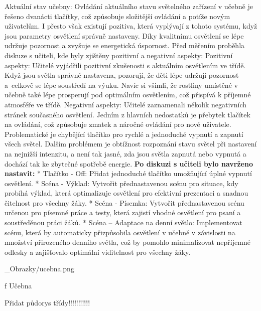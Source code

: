 \sec Aktuální stav učebny:
\medskip
Ovládání aktuálního stavu světelného zařízení v učebně je řešeno dvanácti tlačítky, což způsobuje složitější ovládání a potíže novým uživatelům. I přesto však existují pozitiva, která vyplývají z tohoto systému, když jsou parametry osvětlení správně nastaveny. Díky kvalitnímu osvětlení se lépe udržuje pozornost a zvyšuje se energetická úspornost.
\medskip
Před měřením proběhla diskuze s učiteli, kde byly zjištěny pozitivní a negativní aspekty:
\medskip
{\sbf Pozitivní aspekty:}
Učitelé vyjádřili pozitivní zkušenosti s aktuálním osvětlením ve třídě. Když jsou světla správně nastavena, pozorují, že děti lépe udržují pozornost a~celkově se lépe soustředí na výuku. Navíc si všimli, že rostliny umístěné v učebně také lépe prosperují pod optimálním osvětlením, což přispívá k příjemné atmosféře ve třídě.
\medskip
{\sbf Negativní aspekty:}
Učitelé zaznamenali několik negativních stránek současného osvětlení. Jedním z hlavních nedostatků je přebytek tlačítek na ovládání, což způsobuje zmatek a náročné ovládání pro nové uživatele. Problematické je chybějící tlačítko pro rychlé a jednoduché vypnutí a zapnutí všech světel. Dalším problémem je obtížnost rozpoznání stavu světel při nastavení na nejnižší intenzitu, a není tak jasné, zda jsou světla zapnutá nebo vypnutá a dochází tak ke zbytečné spotřebě energie. 
\medskip
{\bf Po diskuzi s učiteli bylo navrženo nastavit:}
\medskip
\begitems
    * {\sbf Tlačítko - Off:} Přidat jednoduché tlačítko umožňující úplné vypnutí osvětlení.
\medskip
    * {\sbf Scéna - Výklad:} Vytvořit přednastavenou scénu pro situace, kdy probíhá výklad, která optimalizuje osvětlení pro efektivní prezentaci a snadnou čitelnost pro všechny žáky.
\medskip
    * {\sbf Scéna - Písemka:} Vytvořit přednastavenou scénu určenou pro písemné práce a testy, která zajistí vhodné osvětlení pro psaní a soustředěnou práci žáků.
\medskip
    * {\sbf Scéna – Adaptace na denní světlo:} Implementovat scénu, která by automaticky přizpůsobila osvětlení v učebně v závislosti na množství přirozeného denního světla, což by pomohlo minimalizovat nepříjemné odlesky a zajišťovalo optimální viditelnost pro všechny žáky.
\enditems

\medskip {}
\picw=15cm _Obrazky/ucebna.png
\caption/f Učebna
\medskip

Přidat půdorys třídy!!!!!!!!!!! 







